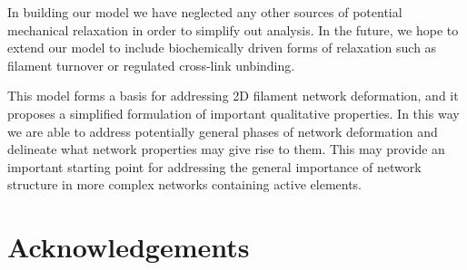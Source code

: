 \documentclass[pre,preprint]{revtex4-1}
\begin{document}
In building our model we have neglected any other sources of potential mechanical relaxation in order to simplify out analysis. In the future, we hope to extend our model to include biochemically driven forms of relaxation such as filament turnover or regulated cross-link unbinding.

This model forms a basis for addressing 2D filament network deformation, and it proposes a simplified formulation of important qualitative properties. In this way we are able to address potentially general phases of network deformation and delineate what network properties may give rise to them.  This may provide an important starting point for addressing the general importance of network structure in more complex networks containing active elements. 



















\section{Acknowledgements}


















\appendix
\addappheadtotoc
\end{document}
